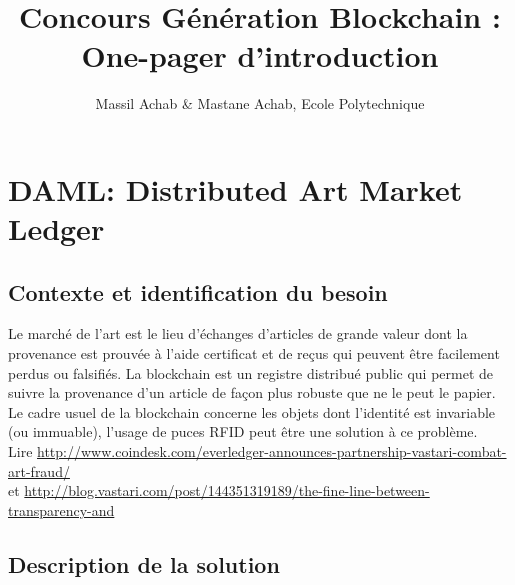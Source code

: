 \documentclass{article}
\title{Concours G\'en\'eration Blockchain : One-pager d'introduction}
\author[1]{Massil Achab \& Mastane Achab, Ecole Polytechnique}
\begin{document}
\maketitle

\section*{DAML: Distributed Art Market Ledger}

\subsection*{Contexte et identification du besoin}
Le march\'e de l'art est le lieu d'\'echanges d'articles de grande valeur dont la provenance est prouv\'ee à l'aide certificat et de reçus qui peuvent être facilement perdus ou falsifi\'es.
La blockchain est un registre distribu\'e public qui permet de suivre la provenance d'un article de façon plus robuste que ne le peut le papier. \\
Le cadre usuel de la blockchain concerne les objets dont l'identité est invariable (ou immuable), l'usage de puces RFID peut être une solution à ce problème. \\
Lire \url{http://www.coindesk.com/everledger-announces-partnership-vastari-combat-art-fraud/} \\
et \url{http://blog.vastari.com/post/144351319189/the-fine-line-between-transparency-and}

\subsection*{Description de la solution}
\end{document}
